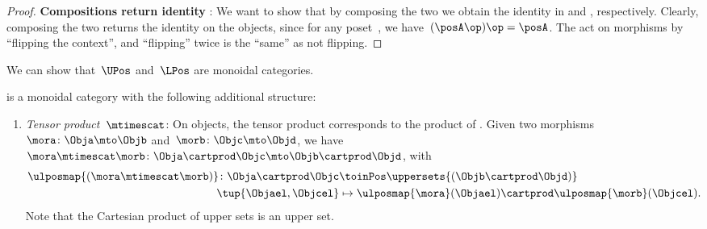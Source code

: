 \begin{proof}
    \textbf{Compositions return identity }:
    We want to show that by composing the two  we obtain the identity  in \UPos and \LPos, respectively.
    Clearly, composing the two  returns the identity on the objects, since for any poset~\posA, we have~$(\posA\op)\op=\posA$.
    The  act on morphisms by ``flipping the context'', and ``flipping'' twice is the ``same'' as not flipping.
\end{proof}

We can show that~$\UPos$ and~$\LPos$ are monoidal categories.

\begin{lemma}
    \label{lem:upos_moncat}
    \UPos is a monoidal category with the following additional structure:
    \begin{enumerate}
        \item \emph{Tensor product~$\mtimescat$}: On objects, the tensor product corresponds to the product of .
              Given two morphisms~$\mora\colon \Obja\mto \Objb$ and~$\morb\colon \Objc\mto \Objd$, we have~$\mora \mtimescat \morb\colon  \Obja \cartprod \Objc \mto \Objb\cartprod \Objd$, with
              \begin{equation}
                  \begin{aligned}
                      \ulposmap{(\mora\mtimescat \morb)}\colon \Obja \cartprod \Objc & \toinPos \uppersets{(\Objb\cartprod \Objd)} \\
                      \tup{\Objael,\Objcel}                                          & \mapsto \ulposmap{\mora}(\Objael)\cartprod \ulposmap{\morb}(\Objcel).
                  \end{aligned}
              \end{equation}
              Note that the Cartesian product of upper sets is an upper set.


\end{enumerate}
\end{lemma}
